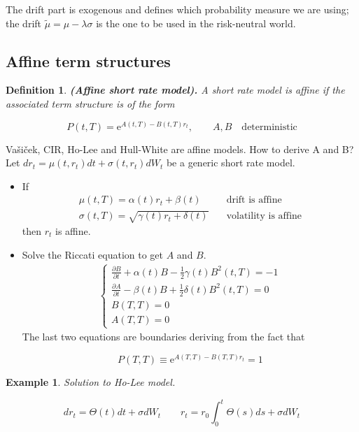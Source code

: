 \documentclass[oneside,titlepage,headinclude,12pt,a4paper,BCOR5mm,footinclude]{book}
\theoremstyle{defn}
\newtheorem{defn}{Definition}
\newtheorem{example}{Example}
\newcommand{\eexp}{\mathrm{e}}
\newcommand\de\partial
\begin{document}
The drift part is exogenous and  defines which probability measure we are using;
the drift  $\tilde{\mu} =  \mu -  \lambda\sigma$ is the  one to  be used  in the
risk-neutral world.

\subsection{Affine term structures}

\begin{defn}{\textbf{(Affine short rate model).}}
  A short rate  model is \textit{affine} if the associated  term structure is of
  the form

  \[
    P(t,T) = \eexp^{A(t,T) -B(t,T)r_t}, \quad\quad A,B\quad\text{deterministic}
  \]
\end{defn}

Va\v{s}i\v{c}ek, CIR, Ho-Lee  and Hull-White are affine models. How  to derive A
and B? Let  $dr_t = \mu(t,r_t) dt  + \sigma(t,r_t)dW_t$ be a  generic short rate
model.

\begin{itemize}
  \item If 
    \begin{align*}
      \mu(t,T) = \alpha(t)r_t + \beta(t) &\quad \text{drift is affine} \\
      \sigma(t,T) = \sqrt{\gamma(t)r_t + \delta(t)} &\quad \text{volatility is affine}
    \end{align*}
    then $r_t$ is affine.
  \item Solve the Riccati equation to get $A$ and $B$.
    \begin{gather*}
      \begin{cases}
        \frac{\de B}{\de t} + \alpha(t)B - \frac{1}{2}\gamma(t)B^2(t,T) = -1
        \\
        \frac{\de A}{\de t} - \beta(t)B + \frac{1}{2} \delta(t)B^2(t,T) = 0
        \\ B(T,T) = 0
        \\ A(T,T) = 0
      \end{cases}
    \end{gather*}
    The last two equations are boundaries deriving from the fact that

    \[ P(T,T) \equiv \eexp^{A(T,T) - B(T,T)r_t} = 1 \]
\end{itemize}

\begin{example} Solution to Ho-Lee model.

  \[
    dr_t = \Theta(t)dt + \sigma dW_t \quad\quad r_t = r_0 \int_0^t \Theta(s)ds + \sigma dW_t
  \]
\end{example}
\end{document}
